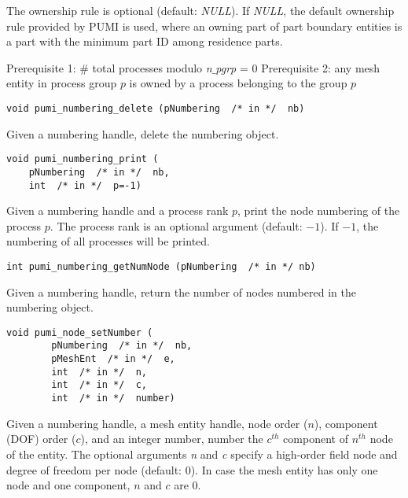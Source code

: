 The ownership rule is optional (default: \emph{NULL}). If \emph{NULL}, the default ownership rule provided by PUMI is used, where an owning part of part boundary entities is a part with the minimum part ID among residence parts.

Prerequisite 1: \# total processes modulo \emph{n}$\_$\emph{pgrp} = 0\newline
Prerequisite 2: any mesh entity in process group $p$ is owned by a process belonging to the group $p$

\begin{verbatim}
void pumi_numbering_delete (pNumbering  /* in */  nb)
\end{verbatim}\vspace{-.5cm}\hspace{1cm}
Given a numbering handle, delete the numbering object.

\begin{verbatim}
void pumi_numbering_print (
    pNumbering  /* in */  nb, 
    int  /* in */  p=-1)
\end{verbatim}\vspace{-.5cm}\hspace{1cm}
Given a numbering handle and a process rank $p$, print the node numbering of the process $p$.
The process rank is an optional argument (default: $-1$). If $-1$, the numbering of all processes will be printed.

\begin{verbatim}
int pumi_numbering_getNumNode (pNumbering  /* in */ nb)
\end{verbatim}\vspace{-.5cm}\hspace{1cm}
Given a numbering handle, return the number of nodes numbered in the numbering object.

\begin{verbatim}
void pumi_node_setNumber (
        pNumbering  /* in */  nb, 
        pMeshEnt  /* in */  e,
        int  /* in */  n,
        int  /* in */  c,
        int  /* in */  number)
\end{verbatim}\vspace{-.5cm}\hspace{1cm}
Given a numbering handle, a mesh entity handle, node order ($n$), component (DOF) order ($c$), and an integer number, number the $c^{th}$ component of $n^{th}$ node of the entity. The optional arguments \emph{n} and \emph{c} specify a high-order field node and degree of freedom per node (default: $0$). In case the mesh entity has only one node and one component, $n$ and $c$ are $0$.

